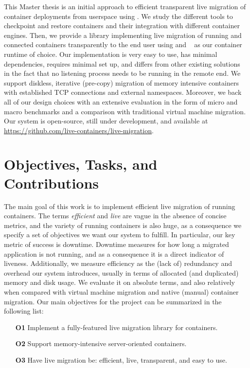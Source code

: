 This Master thesis is an initial approach to efficient transparent live
migration of container deployments from userspace using \criu.
We study the different tools to checkpoint and restore containers and their
integration with different container engines.
Then, we provide a library implementing live migration of running and connected
containers transparently to the end user using \criu and
\runc~\cite{introducing-runc} as our container runtime of choice.
Our implementation is very easy to use, has minimal dependencies, requires
minimal set up, and differs from other existing solutions~\cite{phaul-github}
in the fact that no listening process needs to be running in the remote end.
We support diskless, iterative (pre-copy) migration of memory intensive
containers with established TCP connections and external namespaces.
Moreover, we back all of our design choices with an extensive evaluation in the
form of micro and macro benchmarks and a comparison with traditional virtual
machine migration.
Our system is open-source, still under development, and available at
\url{https://github.com/live-containers/live-migration}.

\section{Objectives, Tasks, and Contributions}

The main goal of this work is to implement efficient live migration of running
containers.
The terms \textit{efficient} and \textit{live} are vague in the absence of
concise metrics, and the variety of running containers is also huge, as a
consequence we specify a set of objectives we want our system to fulfill.
In particular, our key metric of success is downtime.
Downtime measures for how long a migrated application is not running, and as a
consequence it is a direct indicator of liveness.
Additionally, we measure efficiency as the (lack of) redundancy and overhead
our system introduces, usually in terms of allocated (and duplicated) memory
and disk usage.
We evaluate it on absolute terms, and also relatively when compared with
virtual machine migration and native (manual) container migration.
Our main objectives for the project can be summarized in the following list:
\begin{itemize}
    \item[\textbf{O1}] Implement a fully-featured live migration
          library for containers.
    \item[\textbf{O2}] Support memory-intensive server-oriented containers.
    \item[\textbf{O3}] Have live migration be: efficient, live,
          transparent, and easy to use.
\end{itemize}

